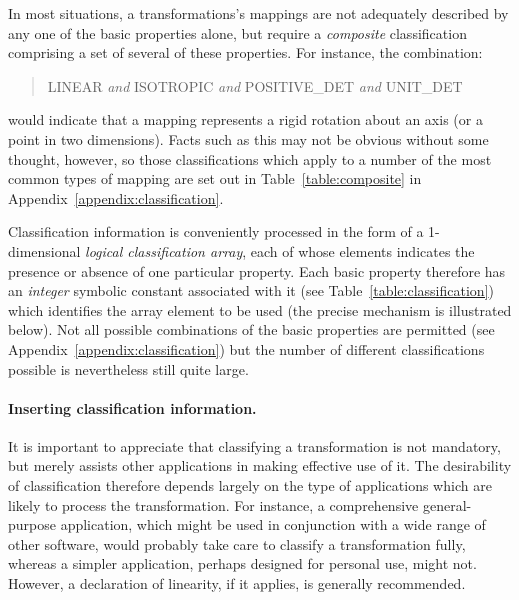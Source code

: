 \documentclass[twoside,nolof,11pt]{starlink}
\providecommand{\name}[1]{\small{#1}}
\begin{document}
In most situations, a transformations's mappings are not adequately
described by any one of the basic properties alone, but require a
\emph{composite} classification comprising a set of several of these
properties.  For instance, the combination:

\begin{quote}
\begin{center}

\name{LINEAR} \emph{and} \name{ISOTROPIC} \emph{and} \name{POSITIVE\_DET}
\emph{and} \name{UNIT\_DET}

\end{center}
\end{quote}

would indicate that a mapping represents a rigid rotation about an axis (or a
point in two dimensions).
Facts such as this may not be obvious without some thought, however, so
those classifications which apply to a number of the most common types of
mapping are set out in Table~\ref{table:composite} in
Appendix~\ref{appendix:classification}.

Classification information is conveniently processed in the form of a
1-dimensional \emph{logical classification array}, each of whose elements
indicates the presence or absence of one particular property.
Each basic property therefore has an \emph{integer} symbolic constant
associated with it (see Table~\ref{table:classification}) which identifies
the array element to be used (the precise mechanism is illustrated below).
Not all possible combinations of the basic properties are permitted (see
Appendix~\ref{appendix:classification}) but the number of different
classifications possible is nevertheless still quite large.

\paragraph{Inserting classification information.}
It is important to appreciate that classifying a transformation is not
mandatory, but merely assists other applications in making effective
use of it.
The desirability of classification therefore depends largely on the type of
applications which are likely to process the transformation.
For instance, a comprehensive general-purpose application, which might be
used in conjunction with a wide range of other software, would probably take
care to classify a transformation fully, whereas a simpler application,
perhaps designed for personal use, might not.
However, a declaration of linearity, if it applies, is generally
recommended.
\end{document}
